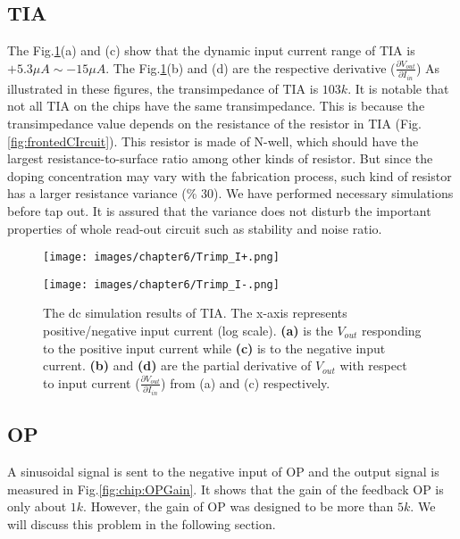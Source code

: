 \subsection{TIA}
The Fig.\ref{fig:chip:TIA}(a) and (c) show that the dynamic input current range of TIA is $+5.3\mu A \sim -15\mu A$.
The Fig.\ref{fig:chip:TIA}(b) and (d) are the respective derivative ($\frac{\partial V_{out}}{\partial I_{in}}$)
As illustrated in these figures, the transimpedance of TIA is $103k$.
It is notable that not all TIA on the chips have the same transimpedance.
This is because the transimpedance value depends on the resistance of the resistor in TIA (Fig.\ref{fig:frontedCIrcuit}).
This resistor is made of N-well, which should have the largest resistance-to-surface ratio among other kinds of resistor.
But since the doping concentration may vary with the fabrication process, such kind of resistor has a larger resistance variance (\% 30).
We have performed necessary simulations before tap out.
It is assured that the variance does not disturb the important properties of whole read-out circuit such as stability and noise ratio.

\begin{figure}[tbh!]
    \centering
    \begin{minipage}[t]{0.8\textwidth}
        \texttt{[image: images/chapter6/Trimp\_I+.png]}
        \raggedleft
    \end{minipage}
    \hfill
    \centering
    \begin{minipage}[t]{0.8\textwidth}
        \texttt{[image: images/chapter6/Trimp\_I-.png]}
        \raggedleft
    \end{minipage}
    \caption{The dc simulation results of TIA. The x-axis represents positive/negative input current (log scale). \textbf{(a)} is the $V_{out}$ responding to the positive input current while \textbf{(c)} is to the negative input current.
                    \textbf{(b)} and \textbf{(d)} are the partial derivative of $V_{out}$ with respect to input current ($\frac{\partial V_{out}}{\partial {I_{in}}}$) from (a) and (c) respectively.}
    \label{fig:chip:TIA}
\end{figure}




\subsection{OP} \label{sec:ch6:OP}
A sinusoidal signal is sent to the negative input of OP and the output signal is measured in Fig.\ref{fig:chip:OPGain}.
It shows that the gain of the feedback OP is only about $1k$.
However, the gain of OP was designed to be more than $5k$.
We will discuss this problem in the following section.

